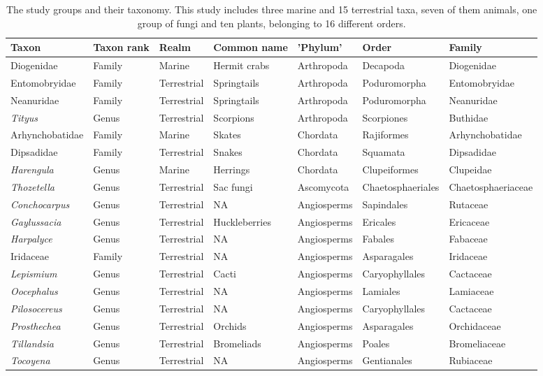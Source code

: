 \documentclass[fleqn,10pt,lineno]{wlpeerj} %
\begin{document}
\begin{landscape}\begin{table}

\caption{\label{tab:tabletaxa}The study groups and their taxonomy. This study includes three marine and 15 terrestrial taxa, seven of them animals, one group of fungi and ten plants, belonging to 16 different orders.}
\centering
\fontsize{11}{13}\selectfont
\begin{tabular}[t]{>{\raggedright\arraybackslash}p{2.5cm}>{\raggedright\arraybackslash}p{2cm}>{\raggedright\arraybackslash}p{2cm}>{\raggedright\arraybackslash}p{2.5cm}>{\raggedright\arraybackslash}p{2.5cm}ll}
\toprule
Taxon & Taxon rank & Realm & Common name & 'Phylum' & Order & Family\\
\midrule
Diogenidae & Family & Marine & Hermit crabs & Arthropoda & Decapoda & Diogenidae\\
Entomobryidae & Family & Terrestrial & Springtails & Arthropoda & Poduromorpha & Entomobryidae\\
Neanuridae & Family & Terrestrial & Springtails & Arthropoda & Poduromorpha & Neanuridae\\
\em{Tityus} & Genus & Terrestrial & Scorpions & Arthropoda & Scorpiones & Buthidae\\
Arhynchobatidae & Family & Marine & Skates & Chordata & Rajiformes & Arhynchobatidae\\
\addlinespace
Dipsadidae & Family & Terrestrial & Snakes & Chordata & Squamata & Dipsadidae\\
\em{Harengula} & Genus & Marine & Herrings & Chordata & Clupeiformes & Clupeidae\\
\hline
\em{Thozetella} & Genus & Terrestrial & Sac fungi & Ascomycota & Chaetosphaeriales & Chaetosphaeriaceae\\
\hline
\em{Conchocarpus} & Genus & Terrestrial & NA & Angiosperms & Sapindales & Rutaceae\\
\em{Gaylussacia} & Genus & Terrestrial & Huckleberries & Angiosperms & Ericales & Ericaceae\\
\addlinespace
\em{Harpalyce} & Genus & Terrestrial & NA & Angiosperms & Fabales & Fabaceae\\
Iridaceae & Family & Terrestrial & NA & Angiosperms & Asparagales & Iridaceae\\
\em{Lepismium} & Genus & Terrestrial & Cacti & Angiosperms & Caryophyllales & Cactaceae\\
\em{Oocephalus} & Genus & Terrestrial & NA & Angiosperms & Lamiales & Lamiaceae\\
\em{Pilosocereus} & Genus & Terrestrial & NA & Angiosperms & Caryophyllales & Cactaceae\\
\addlinespace
\em{Prosthechea} & Genus & Terrestrial & Orchids & Angiosperms & Asparagales & Orchidaceae\\
\em{Tillandsia} & Genus & Terrestrial & Bromeliads & Angiosperms & Poales & Bromeliaceae\\
\em{Tocoyena} & Genus & Terrestrial & NA & Angiosperms & Gentianales & Rubiaceae\\
\bottomrule
\end{tabular}
\end{table}
\end{landscape}
\end{document}
